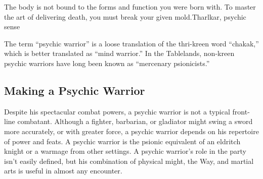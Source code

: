 {The body is not bound to the forms and function you were born with. To master the art of delivering death, you must break your given mold.}{Tharlkar, psychic sense}

The term ``psychic warrior'' is a loose translation of the thri-kreen word ``chakak,'' which is better translated as ``mind warrior.'' In the Tablelands, non-kreen psychic warriors have long been known as ``mercenary psionicists.''


\subsection{Making a Psychic Warrior}
Despite his spectacular combat powers, a psychic warrior is not a typical front-line combatant. Although a fighter, barbarian, or gladiator might swing a sword more accurately, or with greater force, a psychic warrior depends on his repertoire of power and feats. A psychic warrior is the psionic equivalent of an eldritch knight or a warmage from other settings. A psychic warrior's role in the party isn't easily defined, but his combination of physical might, the Way, and martial arts is useful in almost any encounter.

